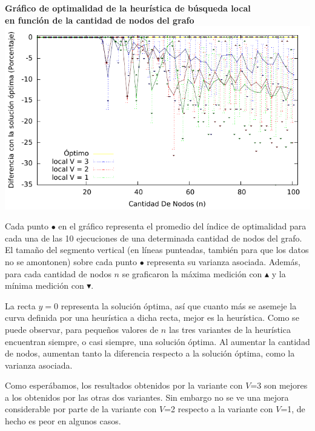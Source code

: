 \begin{center}
\textbf{Gráfico de optimalidad de la heurística de búsqueda local\\
en función de la cantidad de nodos del grafo}
\includegraphics[scale=1.3]{imgs/opt_local_100_2_10.pdf}
\end{center}

\par{Cada punto $\bullet$ en el gráfico representa el promedio del índice de
optimalidad para cada una de las 10 ejecuciones de una determinada cantidad de
nodos del grafo. El tamaño del segmento vertical (en líneas punteadas, también
para que los datos no se amontonen) sobre cada punto $\bullet$
representa su varianza asociada. Además, para cada cantidad de nodos $n$ se
graficaron la máxima medición con $\blacktriangle$ y la mínima medición con
$\blacktriangledown$.}\\

\par{La recta $y=0$ representa la solución óptima, así que cuanto más se
asemeje la curva definida por una heurística a dicha recta, mejor es la
heurística. Como se puede observar, para pequeños valores de $n$ las tres
variantes de la heurística encuentran siempre, o casi siempre, una solución
óptima. Al aumentar la cantidad de nodos, aumentan tanto la diferencia
respecto a la solución óptima, como la varianza asociada.}\\

\par{Como esperábamos, los resultados obtenidos por la variante con $V$=3 son
mejores a los obtenidos por las otras dos variantes. Sin embargo no se ve una
mejora considerable por parte de la variante con $V$=2 respecto a la variante
con $V$=1, de hecho es peor en algunos casos.}\\

